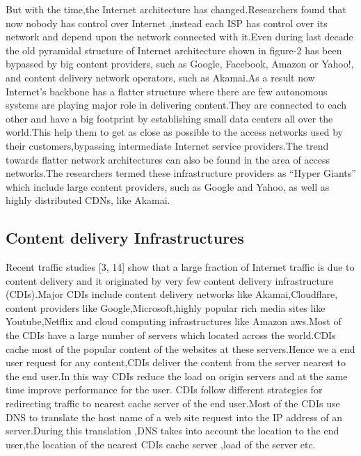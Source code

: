 But with the time,the Internet architecture has changed.Researchers found that now nobody has control over Internet ,instead each ISP has control over its network and depend upon the network connected with it.Even during last decade the old pyramidal structure of Internet architecture shown in figure-2 has been bypassed by big content providers, such as Google, Facebook, Amazon or Yahoo!, and content delivery network operators, such as Akamai.As a result now Internet's backbone has a flatter structure where there are few autonomous systems are playing major role in delivering content.They are connected to each other and have a big footprint by establishing small data centers all over the world.This help them to get as close as possible to the access networks used by their customers,bypassing intermediate Internet service providers.The trend towards flatter network architectures can also be found in the area of access networks.The researchers termed these infrastructure providers as “Hyper Giants” which include large content providers, such as Google and Yahoo, as well as highly distributed CDNs, like Akamai.

\subsection{Content delivery Infrastructures}
Recent traffic studies [3, 14] show that a large fraction of Internet traffic is due
to content delivery  and it originated by very few content delivery infrastructure (CDIs).Major CDIs include content delivery networks like Akamai,Cloudflare, content providers like Google,Microsoft,highly popular rich media sites like Youtube,Netflix and cloud computing infrastructures like Amazon aws.Most of the CDIs have a large number of servers which located across the world.CDIs cache most of the popular content of the websites at these servers.Hence we a end user request for any content,CDIs deliver the content from the server nearest to the end user.In this way CDIs reduce the load on origin servers and at the same time improve performance for the user. CDIs follow different strategies for redirecting traffic to nearest cache server of the end user.Most of the CDIs use DNS to translate the host name
of a web site request into the IP address of an server.During this translation ,DNS takes into account the location to the end user,the location of the nearest CDIs cache server ,load of the server etc.

